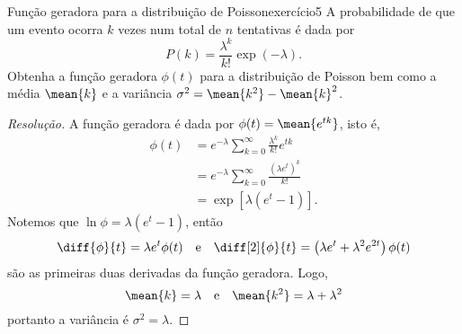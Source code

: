 \begin{exercício}{Função geradora para a distribuição de Poisson}{exercício5}
    A probabilidade de que um evento ocorra \(k\) vezes num total de \(n\) tentativas é dada por
    \begin{equation*}
        P(k) = \frac{\lambda^k}{k!}\exp(-\lambda).
    \end{equation*}
    Obtenha a função geradora \(\phi(t)\) para a distribuição de Poisson bem como a média \(\mean{k}\) e a variância \(\sigma^2 = \mean{k^2} - \mean{k}^2\).
\end{exercício}
\begin{proof}[Resolução]
    A função geradora é dada por \(\phi(t) = \mean{e^{tk}}\), isto é,
    \begin{align*}
        \phi(t) &= e^{-\lambda}\sum_{k = 0}^\infty \frac{\lambda^k}{k!}e^{tk}\\
                &= e^{-\lambda} \sum_{k = 0}^\infty \frac{(\lambda e^t)^k}{k!}\\
                &= \exp[\lambda (e^t - 1)].
    \end{align*}
    Notemos que \(\ln \phi = \lambda (e^t -1)\), então
    \begin{equation*}
        \diff{\phi}{t} = \lambda e^t \phi(t) \quad\text{e}\quad
        \diff[2]{\phi}{t} = \left(\lambda e^t  + \lambda^2 e^{2t}\right)\phi(t)
    \end{equation*}
    são as primeiras duas derivadas da função geradora. Logo,
    \begin{equation*}
        \mean{k} = \lambda\quad\text{e}\quad
        \mean{k^2} = \lambda + \lambda^2
    \end{equation*}
    portanto a variância é \(\sigma^2 = \lambda.\)
\end{proof}
